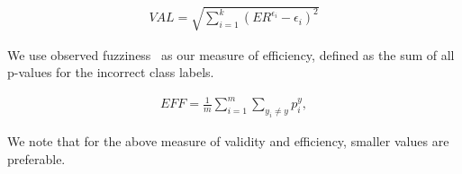 \documentclass[main]{subfiles}
\begin{document}
\begin{definition}[Validity]
\begin{align} \label{eq:validity}
		VAL = \sqrt{ \sum\limits_{i=1}^{k} (ER^{\epsilon_i} -\epsilon_i)^2 }
\end{align}	 
\end{definition}


We use observed fuzziness~\citep{vovk2016criteria} as our measure of efficiency,  defined as the sum of all p-values for the incorrect class labels. %
\begin{definition}[Efficiency]
\begin{align} \label{eq:efficiency}
	EFF =\frac{ 1}{m} \sum\limits_{i=1}^{m} \sum\limits_{y_i \neq y }  p_i^y,		
\end{align}
\end{definition}
We note that for the above measure of validity and efficiency, smaller
values are preferable.
\end{document}
